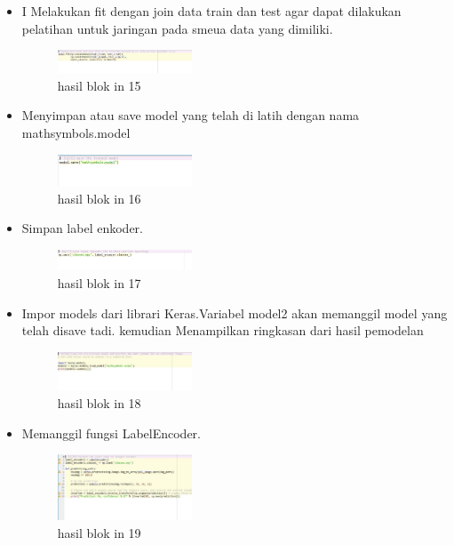 \begin{enumerate}
\begin{itemize}
        \item  I Melakukan fit dengan join data train dan test agar dapat dilakukan pelatihan untuk jaringan pada smeua data yang dimiliki.
        \begin{figure}[H]
            \includegraphics[width=4cm]{figures/1174039/chapter7/praktek15.jpg}
            \centering
            \caption{hasil blok in 15}
        \end{figure}

        \item  Menyimpan atau save model yang telah di latih dengan nama mathsymbols.model 
        \begin{figure}[H]
            \includegraphics[width=4cm]{figures/1174039/chapter7/praktek16.jpg}
            \centering
            \caption{hasil blok in 16}
        \end{figure}

        \item  Simpan label enkoder.
        \begin{figure}[H]
            \includegraphics[width=4cm]{figures/1174039/chapter7/praktek17.jpg}
            \centering
            \caption{hasil blok in 17}
        \end{figure}

        \item  Impor models dari librari Keras.Variabel model2 akan memanggil model yang telah disave tadi. kemudian Menampilkan ringkasan dari hasil pemodelan
        \begin{figure}[H]
            \includegraphics[width=4cm]{figures/1174039/chapter7/praktek18.jpg}
            \centering
            \caption{hasil blok in 18}
        \end{figure}

        \item  Memanggil fungsi LabelEncoder.
        \begin{figure}[H]
            \includegraphics[width=4cm]{figures/1174039/chapter7/praktek19.jpg}
            \centering
            \caption{hasil blok in 19}
        \end{figure}


\end{itemize}
\end{enumerate}
